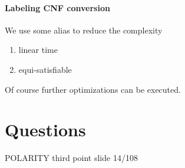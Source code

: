 \documentclass[11pt]{article}
\begin{document}
\paragraph{Labeling CNF conversion} %
\label{par:labeling_cnf_conversion}
We use some alias to reduce the complexity

\begin{enumerate}
	\item linear time
	\item equi-satisfiable
\end{enumerate}
Of course further optimizations can be executed.





\section{Questions} %
\label{sec:questions}
POLARITY third point slide 14/108
\end{document}
